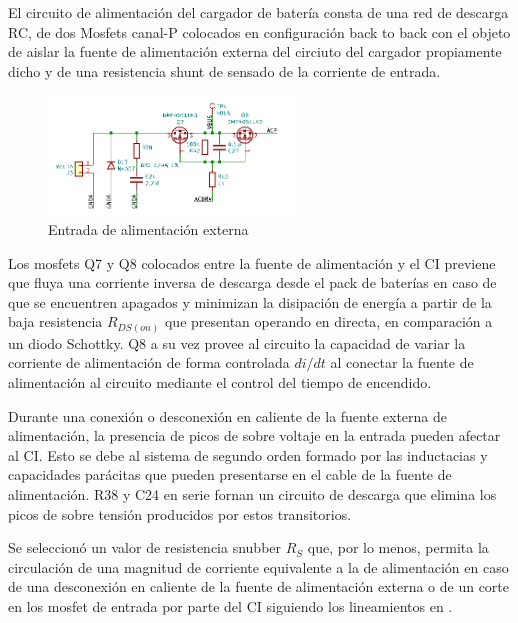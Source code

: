 \documentclass[10pt,a4paper]{article}
\newcounter{subsubsubsection}[subsubsection]
\begin{document}

El circuito de alimentación del cargador de batería consta de una red de descarga
RC, de dos Mosfets canal-P colocados en configuración back to back con el objeto de
aislar la fuente de alimentación externa del circiuto del cargador propiamente
dicho y de una resistencia shunt de sensado de la corriente de entrada. 

\begin{figure}[h!]
    \begin{center}
	\includegraphics[width=0.6\textwidth]{hardware/bat_charger/bc_input.png}
	\caption{Entrada de alimentación externa}
	\label{fig:cb_input}
    \end{center}
\end{figure}
\FloatBarrier

Los mosfets Q7 y Q8 colocados entre la fuente de alimentación y el \acrshort{CI}
previene que fluya una corriente inversa de descarga desde el pack de baterías
en caso de que se encuentren apagados y minimizan la disipación de energía a
partir de la baja resistencia $R_{DS(on)}$ que presentan operando en directa, en
comparación a un diodo Schottky. Q8 a su vez provee al circuito la capacidad de
variar la corriente de alimentación de forma controlada $di/dt$ al conectar la
fuente de alimentación al circuito mediante el control del tiempo de encendido.
    
Durante una conexión o desconexión en caliente de la fuente externa de
alimentación, la presencia de picos de sobre voltaje en la entrada pueden
afectar al \acrshort{CI}. Esto se debe al sistema de segundo orden formado por
las inductacias y capacidades parácitas que pueden presentarse en el cable de la
fuente de alimentación. R38 y C24 en serie fornan un circuito de descarga que
elimina los picos de sobre tensión producidos por estos transitorios.

Se seleccionó un valor de resistencia snubber $R_{S}$ que, por lo menos, permita
la circulación de una magnitud de corriente equivalente a la de alimentación en
caso de una desconexión en caliente de la fuente de alimentación externa o de un
corte en los mosfet de entrada por parte del \acrshort{CI} siguiendo los
lineamientos en \cite{CD_RC_Snubber_AN}.  
\end{document}
